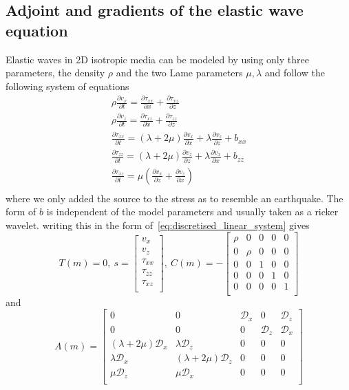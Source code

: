 \documentclass[10pt]{SelfArx} %
\newcommand{\pder}[2][]{\frac{\partial#1}{\partial#2}}
\theoremstyle{definition}
\begin{document}
\subsection{Adjoint and gradients of the elastic wave equation}
Elastic waves in 2D isotropic media can be modeled by using only three parameters, the density $\rho$ and the two Lame parameters $\mu, \lambda$ and follow the following system of equations
\begin{equation}\label{eq:elastic_system}
\begin{aligned}
\rho \pder[v_x]{t} = \pder[\tau_{xx}]{x} + \pder[\tau_{xz}]{z} \\
\rho \pder[v_z]{t} = \pder[\tau_{xz}]{x} + \pder[\tau_{zz}]{z} \\
\pder[\tau_{xx}]{t} = \left(\lambda + 2\mu\right) \pder[v_x]{x} + \lambda \pder[v_z]{z} + b_{xx} \\
\pder[\tau_{zz}]{t} = \left(\lambda + 2\mu\right) \pder[v_z]{z} + \lambda \pder[v_x]{x} + b_{zz} \\
\pder[\tau_{xz}]{t} = \mu\left( \pder[v_x]{z} + \pder[v_z]{x}\right) \\
\end{aligned}
\end{equation} 
where we only added the source to the stress as to resemble an earthquake. The form of $b$ is independent of the model parameters and usually taken as a ricker wavelet. 
writing this in the form of~\cref{eq:discretised_linear_system} gives 
\begin{equation}
T(m) = 0,\ 
s = 
\begin{bmatrix}
v_x \\
v_z \\
\tau_{xx}\\
\tau_{zz} \\
\tau_{xz} \\
\end{bmatrix},\ C\left(m\right) = -
\begin{bmatrix}
\rho & 0 & 0 & 0 & 0 \\
0 & \rho & 0 & 0 & 0 \\
0 & 0 & 1 & 0 & 0 \\
0 & 0 & 0 & 1 & 0 \\
0 & 0 & 0 & 0 & 1 \\
\end{bmatrix}
\end{equation}
and 
\begin{equation}
A\left(m\right) = 
\begin{bmatrix}
0 & 0 & \mathcal{D}_x & 0 & \mathcal{D}_z \\
0 & 0 & 0 & \mathcal{D}_z & \mathcal{D}_x \\
\left(\lambda + 2\mu\right)\mathcal{D}_x & \lambda \mathcal{D}_z & 0 & 0 & 0 \\
\lambda \mathcal{D}_x & \left(\lambda + 2\mu\right) \mathcal{D}_z & 0 & 0 & 0 \\
\mu \mathcal{D}_z & \mu \mathcal{D}_x & 0 & 0 & 0 \\
\end{bmatrix}
\end{equation}
\end{document}
